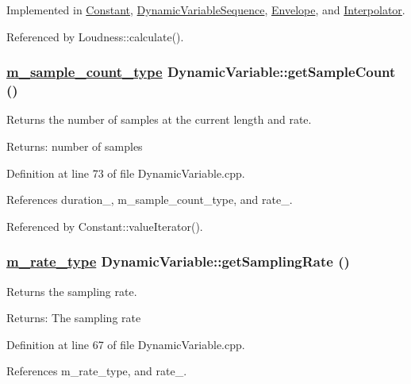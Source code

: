 Implemented in \hyperlink{classConstant_a6}{Constant}, \hyperlink{classDynamicVariableSequence_a26}{Dynamic\-Variable\-Sequence}, \hyperlink{classEnvelope_a28}{Envelope}, and \hyperlink{classInterpolator_a5}{Interpolator}.

Referenced by Loudness::calculate().\hypertarget{classDynamicVariable_a10}{
\subsubsection[getSampleCount]{\setlength{\rightskip}{0pt plus 5cm}\hyperlink{Types_8h_a1}{m\_\-sample\_\-count\_\-type} Dynamic\-Variable::get\-Sample\-Count ()}}
\label{classDynamicVariable_a10}


Returns the number of samples at the current length and rate. \begin{Desc}
\item[Returns:]number of samples \end{Desc}


Definition at line 73 of file Dynamic\-Variable.cpp.

References duration\_\-, m\_\-sample\_\-count\_\-type, and rate\_\-.

Referenced by Constant::value\-Iterator().\hypertarget{classDynamicVariable_a9}{
\subsubsection[getSamplingRate]{\setlength{\rightskip}{0pt plus 5cm}\hyperlink{Types_8h_a4}{m\_\-rate\_\-type} Dynamic\-Variable::get\-Sampling\-Rate ()}}
\label{classDynamicVariable_a9}


Returns the sampling rate. \begin{Desc}
\item[Returns:]The sampling rate \end{Desc}


Definition at line 67 of file Dynamic\-Variable.cpp.

References m\_\-rate\_\-type, and rate\_\-.

